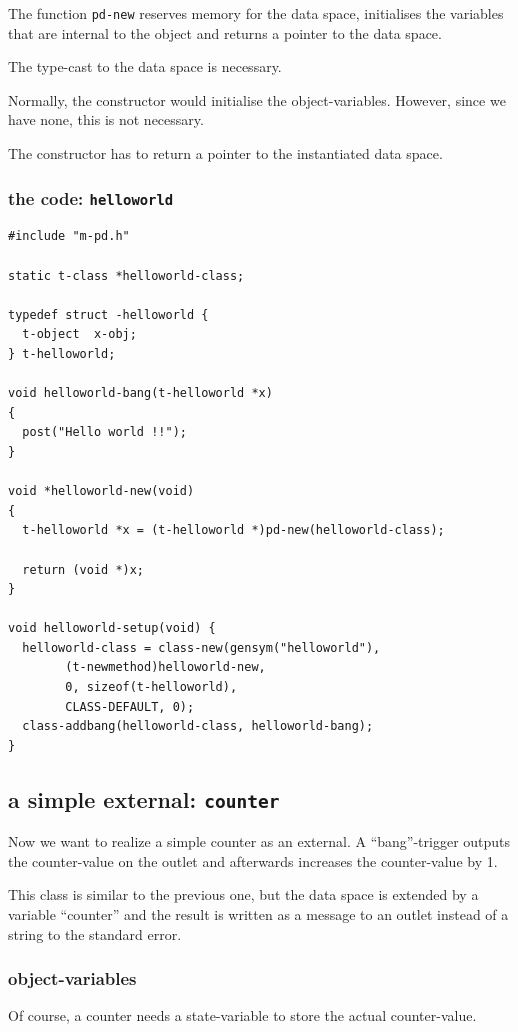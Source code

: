 \documentclass[draft]{ppgmus}
\begin{document}
The function \verb+pd-new+ reserves memory for the data space,
initialises the variables that are internal to the object and
returns a pointer to the data space.

The type-cast to the data space is necessary.

Normally, the constructor would initialise the object-variables.
However, since we have none, this is not necessary.


The constructor has to return a pointer to the instantiated data space.

\subsubsection{the code: \tt helloworld}

\begin{verbatim}
#include "m-pd.h"

static t-class *helloworld-class;

typedef struct -helloworld {
  t-object  x-obj;
} t-helloworld;

void helloworld-bang(t-helloworld *x)
{
  post("Hello world !!");
}

void *helloworld-new(void)
{
  t-helloworld *x = (t-helloworld *)pd-new(helloworld-class);

  return (void *)x;
}

void helloworld-setup(void) {
  helloworld-class = class-new(gensym("helloworld"),
        (t-newmethod)helloworld-new,
        0, sizeof(t-helloworld),
        CLASS-DEFAULT, 0);
  class-addbang(helloworld-class, helloworld-bang);
}
\end{verbatim}


\subsection{a simple external: {\tt counter}}

Now we want to realize a simple counter as an external.
A ``bang''-trigger outputs the counter-value on the outlet and
afterwards increases the counter-value by 1.

This class is similar to the previous one,
but the data space is extended by a variable ``counter'' and the
result is written as a message to an outlet instead of 
a string to the standard error.

\subsubsection{object-variables}
Of course, a counter needs a state-variable to store the actual counter-value.
\end{document}
